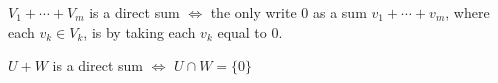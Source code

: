 \setcounter{thm}{44}
\begin{thm}
    $V_1 + \cdots + V_m$ is a direct sum $\iff$ the only write $0$ as a sum $v_1 + \cdots + v_m$, where each $v_k \in V_k$, is by taking each $v_k$ equal to $0$.
\end{thm}


\setcounter{thm}{45}
\begin{thm}
    $U+W$ is a direct sum $\iff$ $U \cap W = \{0\}$
\end{thm}

